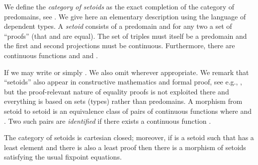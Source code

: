 \documentclass[orivec]{llncs}
\makeatletter
\newif\iffull\fullfalse
\renewcommand{\section}{\@startsection{section}{1}{\z@}{-10\p@ \@plus -4\p@ \@minus -4\p@}{5\p@ \@plus 4\p@ \@minus 4\p@}{\normalfont\bfseries\boldmath\rightskip=\z@ \@plus 8em\pretolerance=10000 }}
\makeatother
\begin{document}
\section{Setoids}
\label{sec:setoids}
We define the \emph{category of setoids} as the exact completion of
the category of predomains, see
\cite{DBLP:conf/mfps/CarboniFS87,DBLP:conf/lics/BirkedalCRS98}. We
give here an elementary description using the language of dependent
types.  A \emph{setoid}  consists of a predomain  and for any
two  a set  of ``proofs'' (that  and  are
equal). The set of triples  must itself
be a predomain and the first and second projections must be
continuous. Furthermore, there are continuous functions  and  and
.
\iffull
We should explain what continuity of a dependent function like
 is: if  and  and  are ascending
chains in  with suprema  and  and  are proofs such that  and 
are ascending chains, too, with suprema  and  then
 is an ascending chain of proofs (by
monotonicity of ) and its supremum is .
\fi
\iffull
 Formally,
such dependent functions can be reduced to non-dependent ones using
pullbacks, that is  would be a function defined on the pullback of
the second and first projections from  to
, but we find the dependent notation to be much more readable.
\fi
If  we may write  or simply . We also
omit  wherever appropriate. We remark that ``setoids'' also appear in
constructive mathematics and formal proof, see e.g.,
\cite{DBLP:journals/jfp/BartheCP03}, but the proof-relevant nature of
equality proofs is not exploited there and everything is based on sets
(types) rather than predomains. 
A morphism from setoid  to setoid  is an equivalence class of  pairs  of
continuous functions where  and . Two such pairs
 are \emph{identified} if there exists a
continuous function . 
\begin{proposition}
The category of setoids is cartesian closed; moreover, if  is a setoid such that  has a least element  and there is also a least proof  then there is a morphism of setoids  satisfying the usual fixpoint equations. 
\end{proposition}
\end{document}
